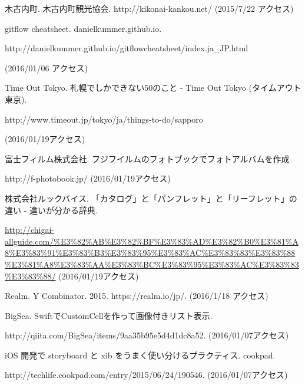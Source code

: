 \documentclass[openany,11pt,papersize]{jsbook}
\begin{document}
\begin{thebibliography}{99}

木古内町. 木古内町観光協会. http://kikonai-kankou.net/ (2015/7/22 アクセス)

gitflow cheatsheet. danielkummer.github.io. \par
http://danielkummer.github.io/gitflowcheatsheet/index.ja\_JP.html \par
(2016/01/06 アクセス)

Time Out Tokyo. 札幌でしかできない50のこと - Time Out Tokyo (タイムアウト東京). \par
http://www.timeout.jp/tokyo/ja/things-to-do/sapporo \par
(2016/01/19アクセス)

富士フィルム株式会社. フジフイルムのフォトブックでフォトアルバムを作成 \par
http://f-photobook.jp/ (2016/01/19アクセス)

株式会社ルックバイス. 「カタログ」と「パンフレット」と「リーフレット」の違い - 違いが分かる辞典. \par
\url{http://chigai-allguide.com/%E3%82%AB%E3%82%BF%E3%83%AD%E3%82%B0%E3%81%A8%E3%83%91%E3%83%B3%E3%83%95%E3%83%AC%E3%83%83%E3%83%88%E3%81%A8%E3%83%AA%E3%83%BC%E3%83%95%E3%83%AC%E3%83%83%E3%83%88/} 
(2016/01/19アクセス)

Realm. Y Combinator. 2015. https://realm.io/jp/. (2016/1/18 アクセス)

BigSea. SwiftでCustomCellを作って画像付きリスト表示. \par
http://qiita.com/BigSea/items/9aa35b95e5d4d1dc8a52. (2016/01/07アクセス)

\bibitem{}
iOS 開発で storyboard と xib をうまく使い分けるプラクティス. cookpad. \par
http://techlife.cookpad.com/entry/2015/06/24/190546. (2016/01/07アクセス)




\end{thebibliography}
\end{document}
